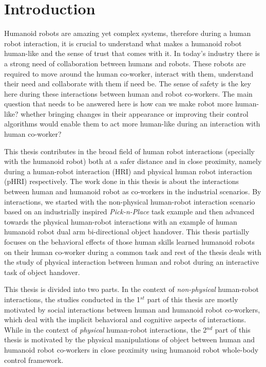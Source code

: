 
{\color{blue}\chapter*{Introduction}}
\pagestyle{plain}

Humanoid robots are amazing yet complex systems, therefore during a human robot interaction, it is crucial to understand what makes a humanoid robot human-like and the sense of trust that comes with it. In today's industry there is a strong need of collaboration between humans and robots. These robots are required to move around the human co-worker, interact with them, understand their need and collaborate with them if need be. The sense of safety is the key here during these interactions between human and robot co-workers. The main question that needs to be answered here is how can we make robot more human-like? whether bringing changes in their appearance or improving their control algorithms would enable them to act more human-like during an interaction with human co-worker?

This thesis contributes in the broad field of human robot interactions (specially with the humanoid robot) both at a safer distance and in close proximity, namely during a human-robot interaction (HRI) and physical human robot interaction (pHRI) respectively. The work done in this thesis is about the interactions between human and humanoid robot as co-workers in the industrial scenarios. By interactions, we started with the non-physical human-robot interaction scenario based on an industrially inspired \textit{Pick-n-Place} task example and then advanced towards the physical human-robot interactions with an example of human humanoid robot dual arm bi-directional object handover. This thesis partially focuses on the behavioral effects of those human skills learned humanoid robots on their human co-worker during a common task and rest of the thesis deals with the study of physical interaction between human and robot during an interactive task of object handover.

This thesis is divided into two parts. In the context of \textit{non-physical} human-robot interactions, the studies conducted in the 1$^{st}$ part of this thesis are mostly motivated by social interactions between human and humanoid robot co-workers, which deal with the implicit behavioral and cognitive aspects of interactions. While in the context of \textit{physical} human-robot interactions, the 2$^{nd}$ part of this thesis is motivated by the physical manipulations of object between human and humanoid robot co-workers in close proximity using humanoid robot whole-body control framework.


